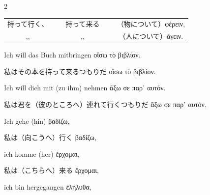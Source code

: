 \begin{paracol}{2}
\begin{enumerate}[leftmargin=0pt,rightmargin=0pt,listparindent =1cm,labelindent=1cm,labelsep=1ex,labelwidth={*},itemindent={*},align=left]
\begin{japanese}
\begin{tabular}[t]{ccccc}
持って行く、 & ~ & 持って来る & ~ & （物について）\textgreek[variant=ancient]{φέρειν,}\tabularnewline
,, &  & ,, &  & （人について）\textgreek[variant=ancient]{ἄγειν.}\tabularnewline
\end{tabular}
\end{japanese}
\switchcolumn*

\begin{continuousitemline}%
\begin{german}
Ich will das Buch mitbringen \textgreek[variant=ancient]{οἴσω
τὸ βιβλίον.}
\end{german}
\switchcolumn

\begin{japanese}
私はその本を持って来るつもりだ \textgreek[variant=ancient]{οἴσω τὸ βιβλίον.}
\end{japanese}
\switchcolumn*

\begin{german}
Ich will dich mit (zu ihm) nehmen \textgreek[variant=ancient]{ἄξω
σε παρ᾽ αυτόν.}
\end{german}
\switchcolumn

\begin{japanese}
私は君を（彼のところへ）連れて行くつもりだ \textgreek[variant=ancient]{ἄξω
σε παρ᾽ αυτόν.}
\end{japanese}
\switchcolumn*
\end{continuousitemline}

\begin{german}
\item Ich gehe (hin) \textgreek[variant=ancient]{βαδίζω,}
\end{german}
\switchcolumn

\begin{japanese}
私は（向こうへ）行く \textgreek[variant=ancient]{βαδίζω,}
\end{japanese}
\switchcolumn*

\begin{continuousitemline}
\begin{german}
ich komme (her) \textgreek[variant=ancient]{ἔρχομαι,}
\end{german}
\switchcolumn

\begin{japanese}
私は（こちらへ）来る \textgreek[variant=ancient]{ἔρχομαι,}
\end{japanese}
\switchcolumn*

\begin{german}
ich bin hergegangen \textgreek[variant=ancient]{ἐλήλυθα,}
\end{german}
\switchcolumn


\end{continuousitemline}
\end{enumerate}
\end{paracol}
